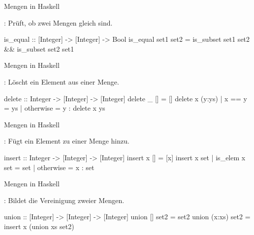 \resetframecounters
\begin{frame}[fragile]{Mengen in Haskell}
    \begin{exercise}[d)]
        : Prüft, ob zwei Mengen gleich sind.
        \end{exercise}
        \begin{solve}[d)]
        \begin{plainhaskell}
is_equal :: [Integer] -> [Integer] -> Bool
is_equal set1 set2 = is_subset set1 set2 && is_subset set2 set1
        \end{plainhaskell}
        \end{solve}
\end{frame}
\resetframecounters
\begin{frame}[fragile]{Mengen in Haskell}
    \begin{exercise}[e)]
        : Löscht ein Element aus einer Menge.
        \end{exercise}
        \begin{solve}[e)]
        \begin{plainhaskell}
delete :: Integer -> [Integer] -> [Integer]
delete _ [] = []
delete x (y:ys)
    | x == y = ys
    | otherwise = y : delete x ys
        \end{plainhaskell}
        \end{solve}
\end{frame}
\resetframecounters
\begin{frame}[fragile]{Mengen in Haskell}
    \begin{exercise}[f)]
        : Fügt ein Element zu einer Menge hinzu.
        \end{exercise}
        \begin{solve}[f)]
        \begin{plainhaskell}
insert :: Integer -> [Integer] -> [Integer]
insert x [] = [x]
insert x set
    | is_elem x set = set
    | otherwise = x : set
        \end{plainhaskell}
        \end{solve}
\end{frame}
\resetframecounters
\begin{frame}[fragile]{Mengen in Haskell}
    \begin{exercise}[g)]
        : Bildet die Vereinigung zweier Mengen.
        \end{exercise}
        \begin{solve}[g)]
        \begin{plainhaskell}
union :: [Integer] -> [Integer] -> [Integer]
union [] set2 = set2
union (x:xs) set2 = insert x (union xs set2)
        \end{plainhaskell}
        \end{solve}
\end{frame}